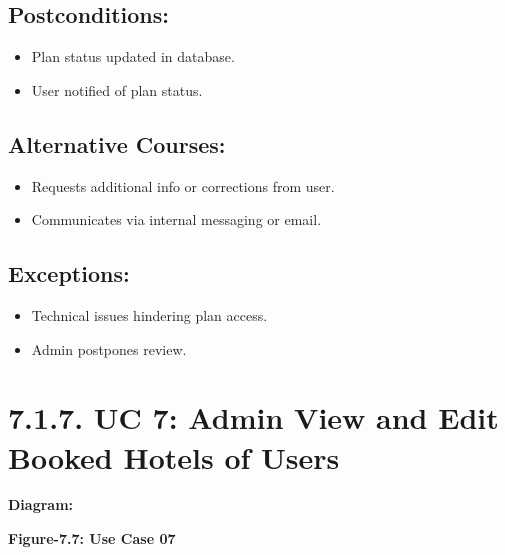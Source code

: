 \documentclass{scrreprt}
\begin{document}
\subsection*{\textbf{Postconditions:}}

\begin{itemize}
    \item Plan status updated in database.
    \item User notified of plan status.
\end{itemize}

\subsection*{\textbf{Alternative Courses:}}

\begin{itemize}
    \item Requests additional info or corrections from user.
    \item Communicates via internal messaging or email.
\end{itemize}

\subsection*{\textbf{Exceptions:}}

\begin{itemize}
    \item Technical issues hindering plan access.
    \item Admin postpones review.
\end{itemize}

\section*{\textbf{7.1.7. UC 7: Admin View and Edit Booked Hotels of Users}}
\textbf{Diagram:}
\newline
\newline

\begin{center}
    \parbox{0.8\textwidth}{ 
        \centering
    }
\end{center}
\begin{center}
    \parbox{0.8\textwidth}{ 
        \centering
        \textbf{Figure-7.7: Use Case 07}
    }
\end{center}
\end{document}
